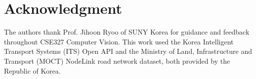 \documentclass[conference]{IEEEtran}
\renewcommand{\_}{\textunderscore\allowbreak}
\begin{document}
\section*{Acknowledgment}
The authors thank Prof. Jihoon Ryoo of SUNY Korea for guidance and feedback
throughout CSE327 Computer Vision. This work used the Korea Intelligent
Transport Systems (ITS) Open API and the Ministry of Land, Infrastructure and
Transport (MOCT) NodeLink road network dataset, both provided by the Republic
of Korea.



\end{document}

